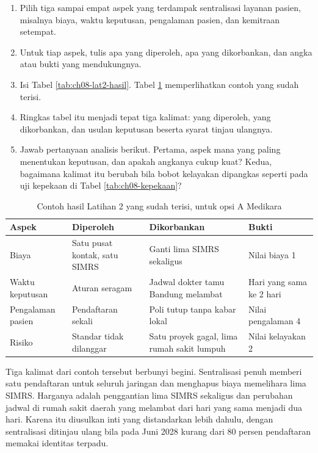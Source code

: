 \begin{enumerate}
  \item Pilih tiga sampai empat aspek yang terdampak sentralisasi layanan pasien, misalnya
        biaya, waktu keputusan, pengalaman pasien, dan kemitraan setempat.
  \item Untuk tiap aspek, tulis apa yang diperoleh, apa yang dikorbankan, dan angka atau
        bukti yang mendukungnya.
  \item Isi Tabel \ref{tab:ch08-lat2-hasil}. Tabel \ref{tab:ch08-lat2-contoh} memperlihatkan
        contoh yang sudah terisi.
  \item Ringkas tabel itu menjadi tepat tiga kalimat: yang diperoleh, yang dikorbankan, dan
        usulan keputusan beserta syarat tinjau ulangnya.
  \item Jawab pertanyaan analisis berikut. Pertama, aspek mana yang paling menentukan
        keputusan, dan apakah angkanya cukup kuat? Kedua, bagaimana kalimat itu berubah bila
        bobot kelayakan dipangkas seperti pada uji kepekaan di Tabel
        \ref{tab:ch08-kepekaan}?
\end{enumerate}

\begin{table}[!htb]
  \centering
  \caption{Contoh hasil Latihan 2 yang sudah terisi, untuk opsi A Medikara}
  \label{tab:ch08-lat2-contoh}
  \begin{tabularx}{\textwidth}{>{\raggedright\arraybackslash}p{2.2cm}>{\raggedright\arraybackslash}X>{\raggedright\arraybackslash}X>{\raggedright\arraybackslash}p{2.5cm}}
    \hline
    \textbf{Aspek} & \textbf{Diperoleh} & \textbf{Dikorbankan} & \textbf{Bukti} \\
    \hline
    Biaya & Satu pusat kontak, satu SIMRS & Ganti lima SIMRS sekaligus & Nilai biaya 1 \\
    \hline
    Waktu keputusan & Aturan seragam & Jadwal dokter tamu Bandung melambat & Hari yang
      sama ke 2 hari \\
    \hline
    Pengalaman pasien & Pendaftaran sekali & Poli tutup tanpa kabar lokal & Nilai
      pengalaman 4 \\
    \hline
    Risiko & Standar tidak dilanggar & Satu proyek gagal, lima rumah sakit lumpuh & Nilai
      kelayakan 2 \\
    \hline
  \end{tabularx}
\end{table}

Tiga kalimat dari contoh tersebut berbunyi begini. Sentralisasi penuh memberi satu
pendaftaran untuk seluruh jaringan dan menghapus biaya memelihara lima SIMRS. Harganya
adalah penggantian lima SIMRS sekaligus dan perubahan jadwal di rumah sakit daerah yang
melambat dari hari yang sama menjadi dua hari. Karena itu diusulkan inti yang distandarkan
lebih dahulu, dengan sentralisasi ditinjau ulang bila pada Juni 2028 kurang dari 80 persen
pendaftaran memakai identitas terpadu.

